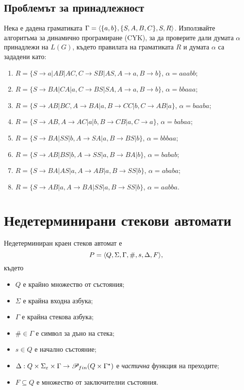\subsection{Проблемът за принадлежност}

\begin{problem}
  Нека е дадена граматиката $\Gamma=\langle{\{a,b\}, \{S,A,B,C\},S,R}\rangle$.
  Използвайте алгоритъма за динамично програмиране (CYK), за да проверите дали
  думата $\alpha$ принадлежи на $L(G)$, където правилата на граматиката $R$ и думата $\alpha$
  са зададени като:
  \begin{enumerate}
  \item
    $R =\{S\rightarrow a| AB|AC, C\rightarrow SB|AS,A\rightarrow a, B\rightarrow b\}$, $\alpha=aaabb$;
  \item
    $R = \{S\rightarrow BA| CA|a, C\rightarrow BS|SA,A\rightarrow a, B\rightarrow b\}$, $\alpha=bbaaa$;
  \item
    $R =\{S\rightarrow AB|BC, A\rightarrow BA|a,B\rightarrow CC|b, C\rightarrow AB|a\}$, $\alpha=baaba$;
  \item
    $R = \{S\rightarrow AB, A\rightarrow AC|a|b,B\rightarrow CB|a, C\rightarrow a\}$, $\alpha=babaa$;
  \item
    $R = \{S\rightarrow BA|SS|b, A\rightarrow SA|a,B\rightarrow BS|b\}$, $\alpha = bbbaa$;
  \item
    $R = \{S\rightarrow AB| BS|b, A\rightarrow SS|a,B\rightarrow BA|b\}$, $\alpha = babab$;
  \item
    $R = \{S\rightarrow BA| AS|a, A\rightarrow AB|a,B\rightarrow SS|b\}$, $\alpha = ababa$;
  \item
    $R = \{S\rightarrow AB|a, A\rightarrow BA|SS|a,B\rightarrow SS|b\}$, $\alpha = aabba$.
  \end{enumerate}
\end{problem}


\section{Недетерминирани стекови автомати}

\begin{dfn}
  Недетерминиран краен стеков автомат е \[P = \langle{Q,\Sigma,\Gamma,\#,s,\Delta,F}\rangle,\] където 
  \begin{itemize}
  \item
    $Q$ е крайно множество от състояния;
  \item  
    $\Sigma$ е крайна входна азбука;
  \item
    $\Gamma$ е крайна стекова азбука;
  \item
    $\# \in \Gamma$ е символ за дъно на стека;
  \item
    $s\in Q$ е начално състояние;
  \item
    $\Delta:Q\times\Sigma_\varepsilon\times\Gamma\rightarrow \mathscr{P}_{fin}(Q\times\Gamma^\star)$ 
    е {\em частична} функция на преходите;    
  \item
    $F\subseteq Q$ е множество от заключителни състояния.
  \end{itemize}
\end{dfn}

